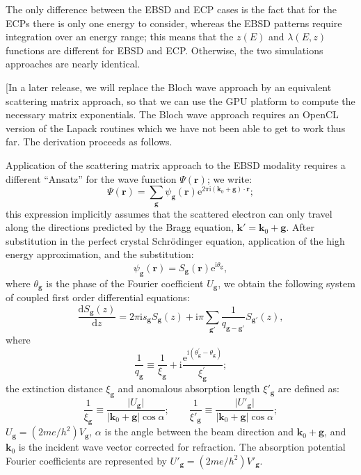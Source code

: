 \documentclass[DIV=calc, paper=letter, fontsize=11pt]{scrartcl}	 %
\begin{document}
The only difference between the EBSD and ECP cases is the fact that for the ECPs there is only one energy to consider,
whereas the EBSD patterns require integration over an energy range; this means that the $z(E)$ and $\lambda(E,z)$
functions are different for EBSD and ECP.  Otherwise, the two simulations approaches are nearly identical.


{\small
[In a later release, we will replace the Bloch wave approach by an equivalent scattering matrix approach, so that we can use the GPU platform
to compute the necessary matrix exponentials.  The Bloch wave approach requires an OpenCL version of the Lapack routines
which we have not been able to get to work thus far.  The derivation proceeds as follows.

Application of the scattering matrix approach to the EBSD modality requires a different ``Ansatz'' for the wave 
function $\Psi(\mathbf{r})$; we write:
\begin{equation}
	\Psi(\mathbf{r}) = \sum_{\mathbf{g}} \psi_{\mathbf{g}}(\mathbf{r}) 
	\mathrm{e}^{2\pi\mathrm{i}(\mathbf{k}_0+\mathbf{g})\cdot\mathbf{r}};\label{eq:planewaves}
\end{equation}
this expression implicitly assumes that the scattered electron can only travel along the directions predicted by the 
Bragg equation, $\mathbf{k}'=\mathbf{k}_0+\mathbf{g}$.  After substitution in the perfect crystal Schr\"odinger equation,
application of the high energy approximation, and the substitution:
\begin{equation}
	\psi_\mathbf{g}(\mathbf{r}) = S_{\mathbf{g}}(\mathbf{r}) \mathrm{e}^{\mathrm{i}\theta_{\mathbf{g}}},\label{eq:psig}
\end{equation}
where $\theta_{\mathbf{g}}$ is the phase of the Fourier coefficient $U_{\mathbf{g}}$, we obtain the following system of 
coupled first order differential equations:
\begin{equation}
    \frac{\mathrm{d} S_{\mathbf{g}}(z)}{\mathrm{d}z} =
    2\pi\mathrm{i}s_{\mathbf{g}}S_{\mathbf{g}}(z) + \mathrm{i}\pi {\sum_{\mathbf{g}'}}
    \frac{1}
    {q_{\mathbf{g}-\mathbf{g}'}}S_{\mathbf{g}'}(z),\label{eq:defectequation}
\end{equation}
where
\begin{equation}
	\frac{1}{q_{\mathbf{g}}} \equiv \frac{1}{\xi_{\mathbf{g}}} + \mathrm{i}
	\frac{\mathrm{e}^{\mathrm{i} (\theta^{\prime}_{\mathbf{g}}-\theta_{\mathbf{g}})}}{\xi^{\prime}_{\mathbf{g}}};
	\label{eq:defineq}
\end{equation}
the extinction distance $\xi_{\mathbf{g}}$ and anomalous absorption length $\xi'_{\mathbf{g}}$ are defined as:
\begin{equation}
	\frac{1}{\xi_{\mathbf{g}}}\equiv \frac{\vert U_{\mathbf{g}}\vert}{\vert\mathbf{k}_0+\mathbf{g}\vert\cos\alpha};\qquad
	\frac{1}{\xi'_{\mathbf{g}}}\equiv \frac{\vert U'_{\mathbf{g}}\vert}{\vert\mathbf{k}_0+\mathbf{g}\vert\cos\alpha};
\end{equation}
$U_{\mathbf{g}} = (2me/h^2) V_{\mathbf{g}} $, $\alpha$ is the angle between the beam direction and $\mathbf{k}_0+\mathbf{g}$, and $\mathbf{k}_0$ is 
the incident wave vector corrected for refraction.  The absorption potential Fourier coefficients are represented by $U'_{\mathbf{g}} = (2me/h^2) V'_{\mathbf{g}}$.

}
\end{document}
